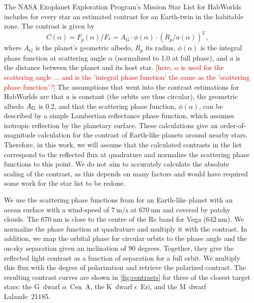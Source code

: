 \documentclass[
    usenatbib,
]{mnras}
\newcommand{\todo}[1]{\textcolor{red}{[#1]}}
\newcommand{\hwo}{HabWorlds}
\begin{document}
The NASA Exoplanet Exploration Program’s Mission Star List for \hwo{} 
includes for every star an estimated contrast for an Earth-twin in 
the habitable zone.
%
The contrast is given by \citep[see, e.g.,][]{2023A&A...671A.165M}
\begin{equation}
    C(\alpha) 
    = F_p(\alpha) / F_* 
    = A_\mathrm{G} \cdot \phi(\alpha) \cdot \left( R_p / a(\alpha) \right)^2 \,,
\label{eq:contrast}
\end{equation}
where $A_\mathrm{G}$ is the planet's geometric albedo, $R_p$ its radius, $\phi(\alpha)$ is the integral phase function at scattering angle $\alpha$
(normalized to \num{1.0} at full phase), and $a$ is the distance between the planet and its host star.
\todo{here, $\alpha$ is used for the scattering angle ... and is the 
'integral phase function' the same as the 'scattering phase function'?}
%
The assumptions that went into the contrast estimations for \hwo{}
are that $a$ is constant (the orbits are thus circular), the geometric albedo $A_{\rm G}$ is \num{0.2}, and that the scattering phase function, $\phi(\alpha)$, can be described by a simple Lambertian reflectance phase function, which assumes isotropic reflection by the planetary surface.
%
These calculations give an order-of-magnitude calculation for the 
contrast of Earth-like planets around nearby stars.
%
Therefore, in this work, we will assume that the calculated contrasts 
in the list correspond to the reflected flux at quadrature and normalize the scattering phase functions to this point.
%
We do not aim to accurately calculate the absolute scaling of the contrast, as this depends on many factors and would have required some work for the star list to be redone.
%

We use the scattering phase functions from \citet{treesandstam2019} 
for an Earth-like planet with an ocean surface with a wind-speed of $\qty{7}{\meter\per\second}$ at $\qty{670}{\nano\meter}$ and covered by patchy clouds.
%
The $\qty{670}{\nano\meter}$ is close to the centre of the Rc band for Vega ($\qty{642}{\nano\meter}$). 
%
We normalize the phase function at quadrature and multiply it with the 
contrast.
%
In addition, we map the orbital phase for circular orbits to the phase angle and the on-sky separation given an inclination of \num{90} degrees.
%
Together, they give the reflected light contrast as a function of separation for a full orbit.
%
We multiply this flux with the degree of polarization and retrieve the polarized contrast.
%
The resulting contrast curves are shown in \cref{fig:contrasts} for 
three of the closest target stars: the G~dwarf $\alpha$~Cen~A, the K~dwarf 
$\epsilon$~Eri, and the M~dwarf Lalande~21185.
\end{document}
